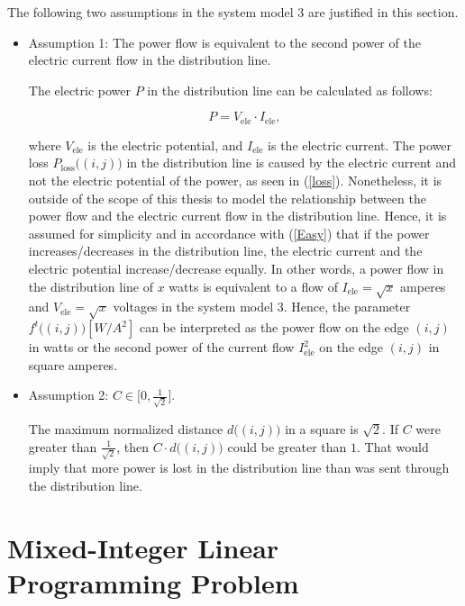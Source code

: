 The following two assumptions in the system model 3 are justified in this section.
\begin{itemize}
\item  Assumption 1: The power flow is equivalent to the second power of the electric current flow in the distribution line.

The electric power $P$ in the distribution line can be calculated as follows:



\begin{equation}\label{Easy}
P=V_{\mathrm{ele}}\cdot I_{\mathrm{ele}},
\end{equation}

\noindent
where $V_{\mathrm{ele}}$ is the electric potential, and $I_{\mathrm{ele}}$ is the electric current. The power loss $P_{\mathrm{loss}}\big((i,j)\big)$ in the distribution line is caused by the electric current and not the electric potential of the power, as seen in (\ref{loss}). Nonetheless, it is outside of the scope of this thesis to model the relationship between the power flow and the electric current flow in the distribution line. Hence, it is assumed for simplicity and in accordance with (\ref{Easy}) that if the power increases/decreases in the distribution line, the electric current and the electric potential increase/decrease equally. In other words, a power flow in the distribution line of $x$ watts is equivalent to a flow of $I_{\mathrm{ele}} = \sqrt{x}$ amperes and $V_{\mathrm{ele}} = \sqrt{x}$ voltages in the system model 3. Hence, the parameter $f^t\big((i,j)\big)[W/A^2]$ can be interpreted as the power flow on the edge $(i,j)$ in watts or the second power of the current flow $I_{\mathrm{ele}}^2$ on the edge $(i,j)$ in square amperes. 
\item Assumption 2: $C\in\big[0,\frac{1}{\sqrt{2}}\big]$.

The maximum normalized distance $d\big((i,j)\big)$ in a square is $\sqrt{2}$. If $C$ were greater than $\frac{1}{\sqrt{2}}$, then $C \cdot d\big((i,j)\big)$ could be greater than $1$. That would imply that more power is lost in the distribution line than was sent through the distribution line. 

\end{itemize}








\section{Mixed-Integer Linear Programming Problem\label{MILPP_pres}}

